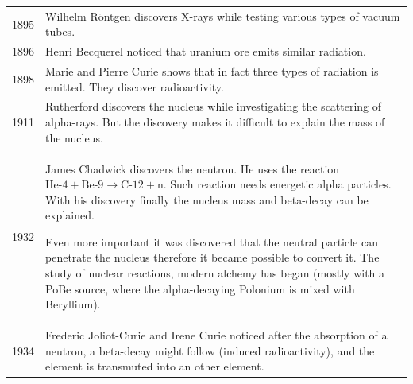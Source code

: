 \begin{tabularx}{\textwidth}{c | X}
1895 & Wilhelm R\"ontgen discovers X-rays  while testing various types of vacuum tubes. \\
1896 & Henri  Becquerel noticed that uranium ore emits similar radiation. \\
1898 & Marie and Pierre Curie shows that in fact three types of radiation is emitted. They discover radioactivity. \\
1911 & Rutherford discovers the nucleus while investigating the scattering of alpha-rays. But the discovery makes it difficult to explain the mass of the nucleus. \\
1932 & James Chadwick discovers the neutron. He uses the reaction $\text{He-4} + \text{Be-9} \rightarrow \text{C-12} + \text{n}$. Such reaction needs energetic alpha particles. With his discovery finally the nucleus mass and beta-decay can be explained.
 
Even more important it was discovered that the neutral particle can penetrate the nucleus therefore it became possible to convert it.  The study of nuclear reactions, modern alchemy has began (mostly with a PoBe source, where the alpha-decaying Polonium is mixed with Beryllium). \\
1934 & Frederic Joliot-Curie and Irene Curie noticed after the absorption of a neutron, a beta-decay might follow (induced radioactivity), and the element is transmuted into an other element. 
\end{tabularx}

